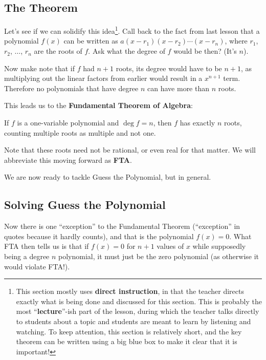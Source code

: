 \subsection{The Theorem}

Let's see if we can solidify this idea\footnote{This section mostly uses \textbf{direct instruction}, in that the teacher directs exactly what is being done and discussed for this section. This is probably the most ``\textbf{lecture}''-ish part of the lesson, during which the teacher talks directly to students about a topic and students are meant to learn by listening and watching. To keep attention, this section is relatively short, and the key theorem can be written using a big blue box to make it clear that it is important!}. Call back to the fact from last lesson that a polynomial $f(x)$ can be written as $a(x-r_1)(x-r_2)\cdots (x-r_n)$, where $r_1$, $r_2$, $\dots$, $r_n$ are the roots of $f$. Ask what the degree of $f$ would be then? (It's $n$). 

Now make note that if $f$ had $n+1$ roots, its degree would have to be $n+1$, as multiplying out the linear factors from earlier would result in a $x^{n+1}$ term. Therefore no polynomials that have degree $n$ can have more than $n$ roots.

This leads us to the \textbf{Fundamental Theorem of Algebra}:
\begin{theorem}
    If $f$ is a one-variable polynomial and $\deg f = n$, then $f$ has exactly $n$ roots, counting multiple roots as multiple and not one.
\end{theorem}

Note that these roots need not be rational, or even real for that matter. We will abbreviate this moving forward as \textbf{FTA}.

We are now ready to tackle Guess the Polynomial, but in general.

\subsection{Solving Guess the Polynomial}

Now there is one ``exception'' to the Fundamental Theorem (``exception'' in quotes because it hardly counts), and that is the polynomial $f(x) = 0$. What FTA then tells us is that if $f(x) = 0$ for $n+1$ values of $x$ while supposedly being a degree $n$ polynomial, it must just be the zero polynomial (as otherwise it would violate FTA!).

